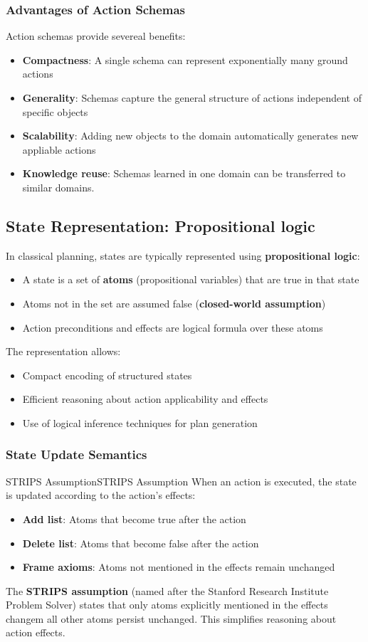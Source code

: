 \documentclass[a4paper]{article}
\theoremstyle{definition}
\begin{document}
\subsubsection{Advantages of Action Schemas}
Action schemas provide severeal benefits:
\begin{itemize}
    \item \textbf{Compactness}: A single schema can represent exponentially many ground actions 
    \item \textbf{Generality}: Schemas capture the general structure of actions independent of specific objects 
    \item \textbf{Scalability}: Adding new objects to the domain automatically generates new appliable actions 
    \item \textbf{Knowledge reuse}: Schemas learned in one domain can be transferred to similar domains.
\end{itemize}
\subsection{State Representation: Propositional logic}
In classical planning, states are typically represented using \textbf{propositional logic}:
\begin{itemize}
    \item A state is a set of \textbf{atoms} (propositional variables) that are true in that state
    \item Atoms not in the set are assumed false (\textbf{closed-world assumption})
    \item Action preconditions and effects are logical formula over these atoms 
\end{itemize}
The representation allows:
\begin{itemize}
    \item Compact encoding of structured states
    \item Efficient reasoning about action applicability and effects 
    \item Use of logical inference techniques for plan generation
\end{itemize}
\subsubsection{State Update Semantics}
\begin{example}{STRIPS Assumption}{STRIPS Assumption}
When an action is executed, the state is updated according to the action's effects:
\begin{itemize}
    \item \textbf{Add list}: Atoms that become true after the action 
    \item \textbf{Delete list}: Atoms that become false after the action
    \item \textbf{Frame axioms}: Atoms not mentioned in the effects remain unchanged
\end{itemize}
The \textbf{STRIPS assumption} (named after the Stanford Research Institute Problem Solver) states
that only atoms explicitly mentioned in the effects changem all other atoms persist unchanged.
This simplifies reasoning about action effects.
\end{example}
\end{document}
